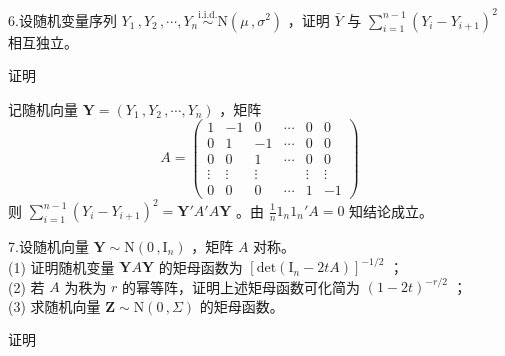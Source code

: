 \documentclass[12pt,hyperref,]{ctexart}
\begin{document}
\vspace{3em}

\kaishu

6.设随机变量序列
\(Y_1\, ,Y_2\, ,\cdots ,Y_n \overset{\mathrm{i.i.d.}}{\sim} \mathrm{N}(\mu\, ,\sigma^2)\)
，证明 \(\bar{Y}\) 与 \(\sum_{i=1}^{n-1}(Y_i-Y_{i+1})^2\) 相互独立。

\vspace{1em}

\heiti

证明

\songti

记随机向量 \(\boldsymbol{Y}=(Y_1\, ,Y_2\, ,\cdots ,Y_n)\) ，矩阵
\begin{equation*}
A=
\begin{pmatrix}
1 & -1 & 0 & \cdots & 0 & 0 \\
0 & 1 & -1 & \cdots & 0 & 0 \\
0 & 0 & 1 & \cdots & 0 & 0 \\
\vdots & \vdots & \vdots & & \vdots & \vdots \\
0 & 0 & 0 & \cdots & 1 & -1
\end{pmatrix}
\end{equation*}则
\(\sum_{i=1}^{n-1}(Y_i-Y_{i+1})^2=\boldsymbol{Y}'A'A\boldsymbol{Y}\)
。由 \(\frac 1n1_n1_n'A=0\) 知结论成立。

\vspace{3em}

\kaishu

7.设随机向量 \(\boldsymbol{Y}\sim\mathrm{N}(0\, ,\mathrm{I}_n)\) ，矩阵
\(A\) 对称。\\
(1) 证明随机变量 \(\boldsymbol{Y}A\boldsymbol{Y}\) 的矩母函数为
\([\mathrm{det}(\mathrm{I}_n-2tA)]^{-1/2}\) ；\\
(2) 若 \(A\) 为秩为 \(r\) 的幂等阵，证明上述矩母函数可化简为
\((1-2t)^{-r/2}\) ；\\
(3) 求随机向量 \(\boldsymbol{Z}\sim \mathrm{N}(0\, ,\Sigma)\)
的矩母函数。

\vspace{1em}

\heiti

证明

\songti
\end{document}
